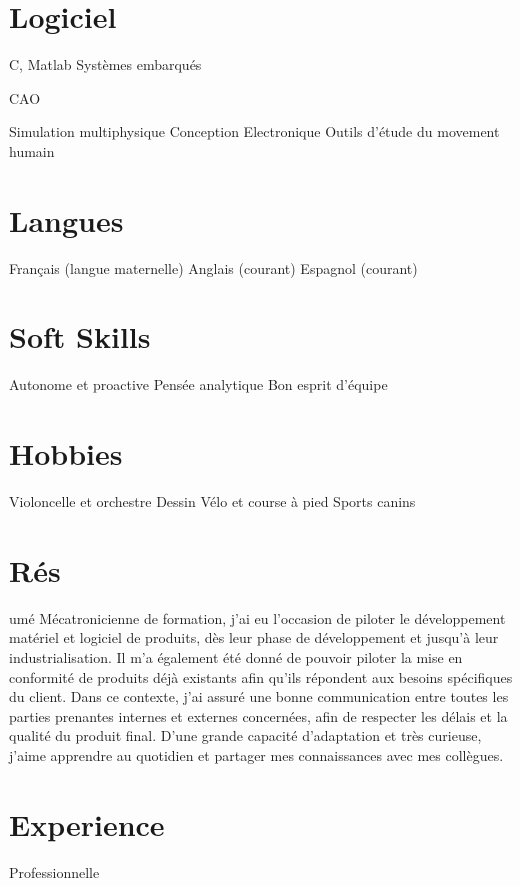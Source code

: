\documentclass{cv-style}     %
\begin{document}
\begin{aside}
    \section{Logiciel}
    C, Matlab
    Systèmes embarqués %

    CAO %

    Simulation multiphysique %
    Conception Electronique %
    Outils d’étude du movement humain %
    \section{Langues}
    Français (langue maternelle)
    Anglais (courant)
    Espagnol (courant)
    \section{Soft Skills}
    Autonome et proactive
    Pensée analytique
    Bon esprit d'équipe
    \section{Hobbies}
    Violoncelle et orchestre
    Dessin
    Vélo et course à pied
    Sports canins
\end{aside}

\section{Rés}{umé}
Mécatronicienne de formation, j’ai eu l’occasion de piloter le développement matériel et logiciel de produits, 
dès leur phase de développement et jusqu'à leur industrialisation. Il m'a également été donné de pouvoir piloter la mise en conformité de produits 
déjà existants afin qu'ils répondent aux besoins spécifiques du client.
Dans ce contexte, j'ai assuré une bonne communication entre toutes les parties prenantes internes et externes concernées, 
afin de respecter les délais et la qualité du produit final.
D'une grande capacité d'adaptation et très curieuse, j’aime apprendre au quotidien et partager mes connaissances avec mes collègues.

\section{Experience}{ Professionnelle}
\end{document}
